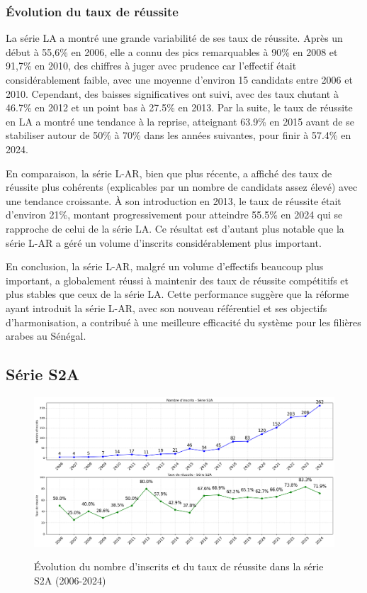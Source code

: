 \subsubsection{Évolution du taux de réussite}

La série LA a montré une grande variabilité de ses taux de réussite. Après un début à 55,6\% en 2006, elle a connu des pics remarquables à 90\% en 2008 et 91,7\% en 2010, des chiffres à juger avec prudence car l’effectif était considérablement faible, avec une moyenne d’environ 15 candidats entre 2006 et 2010.
Cependant, des baisses significatives ont suivi, avec des taux chutant à 46.7\% en 2012 et un point bas à 27.5\% en 2013. 
Par la suite, le taux de réussite en LA a montré une tendance à la reprise, atteignant 63.9\% en 2015 avant de se stabiliser autour de 50\% à 70\% dans les années suivantes, pour finir à 57.4\% en 2024. 

En comparaison, la série L-AR, bien que plus récente, a affiché des taux de réussite plus cohérents (explicables par un nombre de candidats assez élevé) avec une tendance croissante. 
À son introduction en 2013, le taux de réussite était d'environ 21\%, montant progressivement pour atteindre 55.5\% en 2024 qui se rapproche de celui de la série LA.
Ce résultat est d'autant plus notable que la série L-AR a géré un volume d'inscrits considérablement plus important.

En conclusion, la série L-AR, malgré un volume d'effectifs beaucoup plus important, a globalement réussi à maintenir des taux de réussite compétitifs et plus stables que ceux de la série LA.
Cette performance suggère que la réforme ayant introduit la série L-AR, avec son nouveau référentiel et ses objectifs d'harmonisation, a contribué à une meilleure efficacité du système pour les filières arabes au Sénégal.

\subsection{Série S2A}

\begin{figure}[ht]
\centering
\caption{Évolution du nombre d'inscrits et du taux de réussite dans la série S2A (2006-2024)}
\includegraphics[width=1\textwidth]{figure/bac_S2A.png}
\label{fig:S2A}
\end{figure}

